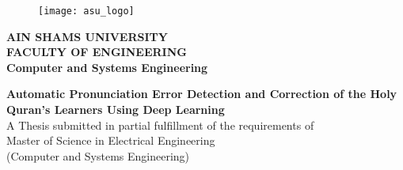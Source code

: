 \thispagestyle{empty} %

\begin{center}
\begin{figure}
  \begin{center}
    \texttt{[image: asu\_logo]}
  \end{center}
\end{figure}
\small
\textbf{AIN SHAMS UNIVERSITY\\
	FACULTY OF ENGINEERING\\
	Computer and Systems Engineering}



\vfill
\Large
\textbf{Automatic Pronunciation Error Detection and Correction of the Holy Quran's Learners Using Deep Learning } \\ 

\vfill
\small
A Thesis submitted in partial fulfillment of the requirements of \\ 
 Master of Science in Electrical Engineering \\
(Computer and Systems Engineering)\\









\end{center}
